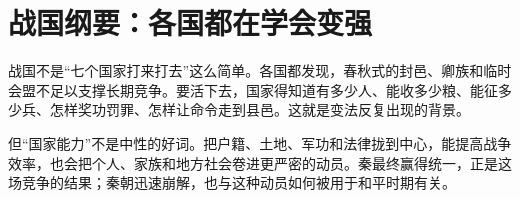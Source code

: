 \section{战国纲要：各国都在学会变强}

战国不是“七个国家打来打去”这么简单。各国都发现，春秋式的封邑、卿族和临时会盟不足以支撑长期竞争。要活下去，国家得知道有多少人、能收多少粮、能征多少兵、怎样奖功罚罪、怎样让命令走到县邑。这就是变法反复出现的背景。

但“国家能力”不是中性的好词。把户籍、土地、军功和法律拢到中心，能提高战争效率，也会把个人、家族和地方社会卷进更严密的动员。秦最终赢得统一，正是这场竞争的结果；秦朝迅速崩解，也与这种动员如何被用于和平时期有关。
